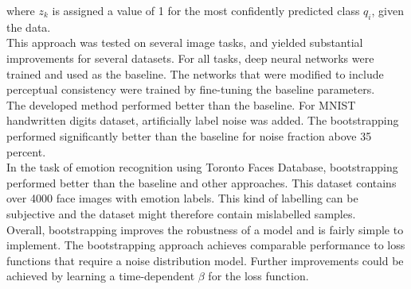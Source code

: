 where $z_k$ is assigned a value of 1 for the most confidently predicted class $q_i$, given the data. \\

This approach was tested on several image tasks, and yielded substantial improvements for several datasets. For all tasks, deep neural networks were trained and used as the baseline. The networks that were modified to include perceptual consistency were trained by fine-tuning the baseline parameters. \\

The developed method performed better than the baseline. For MNIST handwritten digits dataset, artificially label noise was added. The bootstrapping performed significantly better than the baseline for noise fraction above 35 percent.\\

In the task of emotion recognition using Toronto Faces Database, bootstrapping performed better than the baseline and other approaches. This dataset contains over 4000 face images with emotion labels. This kind of labelling can be subjective and the dataset might therefore contain mislabelled samples. \\

Overall, bootstrapping improves the robustness of a model and is fairly simple to implement. The bootstrapping approach achieves comparable performance to loss functions that require a noise distribution model. Further improvements could be achieved by learning a time-dependent $\beta$ for the loss function.










